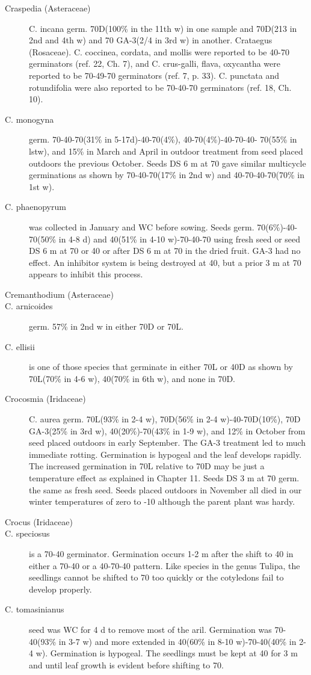 \begin{description}
\item[Craspedia (Asteraceae)] C. incana germ. 70D(100\% in the 11th w) in one
sample and 70D(213 in 2nd and 4th w) and 70 GA-3(2/4 in 3rd w) in another.
Crataegus (Rosaceae). C. coccinea, cordata, and mollis were reported to
be 40-70 germinators (ref. 22, Ch. 7), and C. crus-galli, flava, oxycantha were reported
to be 70-49-70 germinators (ref. 7, p. 33). C. punctata and rotundifolia were also
reported to be 70-40-70 germinators (ref. 18, Ch. 10).
\item[C. monogyna] germ. 70-40-70(31\% in 5-17d)-40-70(4\%), 40-70(4\%)-40-70-40-
70(55\% in lstw), and 15\% in March and April in outdoor treatment from seed placed
outdoors the previous October. Seeds DS 6 m at 70 gave similar multicycle
germinations as shown by 70-40-70(17\% in 2nd w) and 40-70-40-70(70\% in 1st w).
\item[C. phaenopyrum] was collected in January and WC before sowing. Seeds
germ. 70(6\%)-40-70(50\% in 4-8 d) and 40(51\% in 4-10 w)-70-40-70 using fresh seed
or seed DS 6 m at 70 or 40 or after DS 6 m at 70 in the dried fruit. GA-3 had no effect.
An inhibitor system is being destroyed at 40, but a prior 3 m at 70 appears to inhibit
this process.

\item[Cremanthodium (Asteraceae)]
\item[C. arnicoides] germ. 57\% in 2nd w in either 70D or 70L.
\item[C. ellisii] is one of those species that germinate in either 70L or 40D as shown
by 70L(70\% in 4-6 w), 40(70\% in 6th w), and none in 70D.

\item[Crocosmia (Iridaceae)] C. aurea germ. 70L(93\% in 2-4 w), 70D(56\% in 2-4
w)-40-70D(10\%), 70D GA-3(25\% in 3rd w), 40(20\%)-70(43\% in 1-9 w), and 12\% in
October from seed placed outdoors in early September. The GA-3 treatment led to
much immediate rotting. Germination is hypogeal and the leaf develops rapidly. The
increased germination in 70L relative to 70D may be just a temperature effect as
explained in Chapter 11. Seeds DS 3 m at 70 germ. the same as fresh seed. Seeds
placed outdoors in November all died in our winter temperatures of zero to -10
although the parent plant was hardy.

\item[Crocus (Iridaceae)]
\item[C. speciosus] is a 70-40 germinator. Germination occurs 1-2 m after the shift to
40 in either a 70-40 or a 40-70-40 pattern. Like species in the genus Tulipa, the
seedlings cannot be shifted to 70 too quickly or the cotyledons fail to develop properly.
\item[C. tomasinianus] seed was WC for 4 d to remove most of the aril. Germination
was 70-40(93\% in 3-7 w) and more extended in 40(60\% in 8-10 w)-70-40(40\% in 2-4
w). Germination is hypogeal. The seedlings must be kept at 40 for 3 m and until leaf
growth is evident before shifting to 70.


\end{description}
